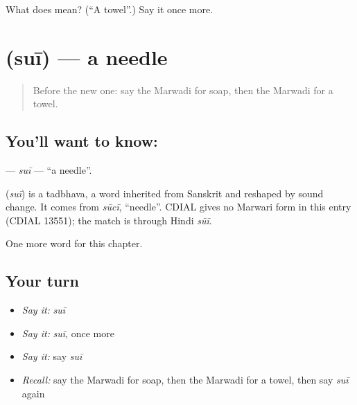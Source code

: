 \begin{tcolorbox}[breakable,colback=teal!4,colframe=teal!35!black,title={Before you move on}]
What does  mean? (\textquotedblleft{}A towel\textquotedblright{}.) Say it once more.
\end{tcolorbox}
\section[\texorpdfstring{\mw{सुई} (suī)}{सुई (suī)}]{ (suī) — a needle}

\label{lesson:MW-C124-sui}



\begin{quote}
Before the new one: say the Marwadi for soap, then the Marwadi for a towel.
\end{quote}

\subsection*{You'll want to know: }
\textbf{} — \emph{suī} — \textquotedblleft{}a needle\textquotedblright{}.

\begin{cousinweb}
\textbf{} (\emph{suī}) is a tadbhava, a word inherited from Sanskrit and reshaped by sound change. It comes from \emph{sūcī}, \textquotedblleft{}needle\textquotedblright{}. CDIAL gives no Marwari form in this entry (CDIAL 13551); the match is through Hindi \emph{sūī}.
\end{cousinweb}

\begin{grammarlens}[title={What you've built}]
One more word for this chapter.
\end{grammarlens}

\subsection*{Your turn}
\begin{itemize}
\raggedright
  \item \emph{Say it:} \emph{suī}
  \item \emph{Say it:} \emph{suī}, once more
  \item \emph{Say it:} say \emph{suī}
  \item \emph{Recall:} say the Marwadi for soap, then the Marwadi for a towel, then say \emph{suī} again
\end{itemize}

